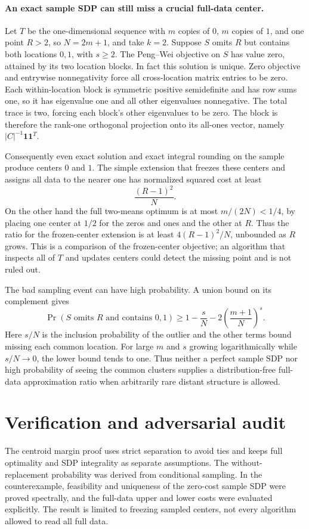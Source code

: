\documentclass[11pt]{article}
\begin{document}
\paragraph{An exact sample SDP can still miss a crucial full-data center.}
Let $T$ be the one-dimensional sequence with $m$ copies of $0$, $m$ copies of $1$, and one point $R>2$, so $N=2m+1$, and take $k=2$. Suppose $S$ omits $R$ but contains both locations $0,1$, with $s\ge2$. The Peng--Wei objective on $S$ has value zero, attained by its two location blocks. In fact this solution is unique. Zero objective and entrywise nonnegativity force all cross-location matrix entries to be zero. Each within-location block is symmetric positive semidefinite and has row sums one, so it has eigenvalue one and all other eigenvalues nonnegative. The total trace is two, forcing each block's other eigenvalues to be zero. The block is therefore the rank-one orthogonal projection onto its all-ones vector, namely $|C|^{-1}\mathbf1\mathbf1^T$.

Consequently even exact solution and exact integral rounding on the sample produce centers $0$ and $1$. The simple extension that freezes these centers and assigns all data to the nearer one has normalized squared cost at least
\[
 \frac{(R-1)^2}{N}.
\]
On the other hand the full two-means optimum is at most $m/(2N)<1/4$, by placing one center at $1/2$ for the zeros and ones and the other at $R$. Thus the ratio for the frozen-center extension is at least $4(R-1)^2/N$, unbounded as $R$ grows. This is a comparison of the frozen-center objective; an algorithm that inspects all of $T$ and updates centers could detect the missing point and is not ruled out.

The bad sampling event can have high probability. A union bound on its complement gives
\[
 \Pr(S\text{ omits }R\text{ and contains }0,1)
 \ge1-\frac{s}{N}-2\left(\frac{m+1}{N}\right)^s.
\]
Here $s/N$ is the inclusion probability of the outlier and the other terms bound missing each common location. For large $m$ and $s$ growing logarithmically while $s/N\to0$, the lower bound tends to one. Thus neither a perfect sample SDP nor high probability of seeing the common clusters supplies a distribution-free full-data approximation ratio when arbitrarily rare distant structure is allowed.
\section{Verification and adversarial audit}
The centroid margin proof uses strict separation to avoid ties and keeps full optimality and SDP integrality as separate assumptions. The without-replacement probability was derived from conditional sampling. In the counterexample, feasibility and uniqueness of the zero-cost sample SDP were proved spectrally, and the full-data upper and lower costs were evaluated explicitly. The result is limited to freezing sampled centers, not every algorithm allowed to read all full data.
\end{document}

